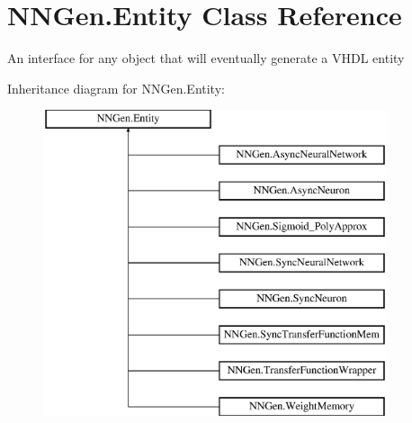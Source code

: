 \hypertarget{class_n_n_gen_1_1_entity}{}\section{N\+N\+Gen.\+Entity Class Reference}
\label{class_n_n_gen_1_1_entity}


An interface for any object that will eventually generate a V\+H\+D\+L entity  


Inheritance diagram for N\+N\+Gen.\+Entity\+:\begin{figure}[H]
\begin{center}
\leavevmode
\includegraphics[height=9.000000cm]{class_n_n_gen_1_1_entity}
\end{center}
\end{figure}
